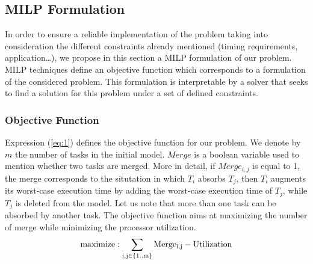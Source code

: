 \documentclass[runningheads,a4paper]{llncs}
\begin{document}
\subsection{MILP Formulation}
In order to ensure a reliable implementation of the problem taking into consideration the different constraints already mentioned (timing requirements, application…), we propose in this section a MILP formulation of our problem. MILP techniques define an objective function which corresponds to a formulation of the considered problem. This formulation is interpretable by a solver that seeks to find a solution for this problem under a set of defined constraints. 

\subsubsection{Objective Function}
Expression (\ref{eq:1}) defines the objective function for our problem. We denote by $m$ the number of tasks in the initial model. $Merge$ is a boolean variable used to mention whether two tasks are merged. More in detail, if $Merge_{i,j}$ is equal to 1, the merge corresponds to the situtation in which $T_i$ absorbs $T_j$, then $T_i$ augments its worst-case execution time by adding the worst-case execution time of $T_j$, while $T_j$ is deleted from the model. Let us note that more than one task can be absorbed by another task. 
The objective function aims at maximizing the number of merge while minimizing the processor utilization. 
\begin{equation}
\footnotesize{ \mathrm{maximize : \sum_{i,j \in \{1..m \}}{Merge_{i,j}} - Utilization }}
\label{eq:1}
\end{equation}
\end{document}
